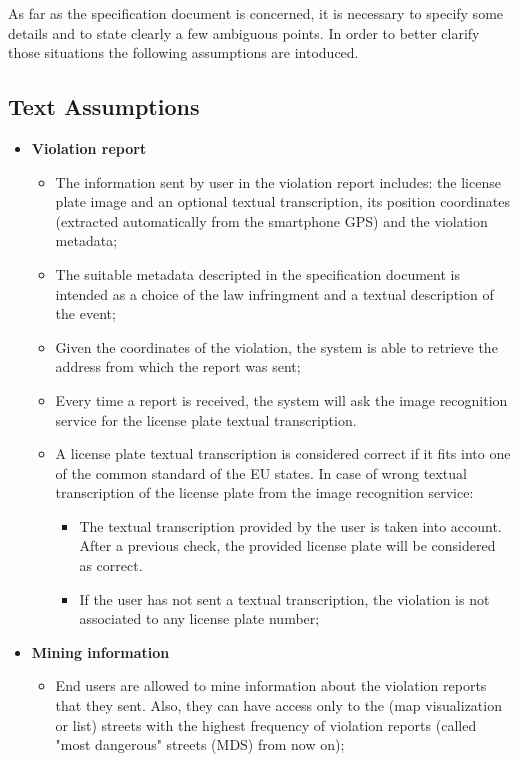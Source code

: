 As far as the specification document is concerned, it is necessary to specify some details and to state clearly a few ambiguous points. In order to better clarify those situations the following assumptions are intoduced.
\subsection{Text Assumptions}
\begin{itemize}
    \item \textbf{Violation report}
        \begin{itemize}
            \item The information sent by user in the violation report includes: the license plate image and an optional textual transcription, its position coordinates (extracted automatically from the smartphone GPS) and the violation metadata;
            \item The suitable metadata descripted in the specification document is intended as a choice of the law infringment and a textual description of the event;
            \item Given the coordinates of the violation, the system is able to retrieve the address from which the report was sent;
            \item Every time a report is received, the system will ask the image recognition service for the license plate textual transcription.
            \item A license plate textual transcription is considered correct if it fits into one of the common standard of the EU states. In case of wrong textual transcription of the license plate from the image recognition service:
            \begin{itemize}
                \item The textual transcription provided by the user is taken into account. After a previous check, the provided license plate will be considered as correct.
                \item If the user has not sent a textual transcription, the violation is not associated to any license plate number;
            \end{itemize} 
        \end{itemize}
    \item \textbf{Mining information} 
        \begin{itemize}
            \item End users are allowed to mine information about the violation reports that they sent. Also, they can have access only to the (map visualization or list) streets with the highest frequency of violation reports (called "most dangerous" streets (MDS) from now on);

\end{itemize}
\end{itemize}
